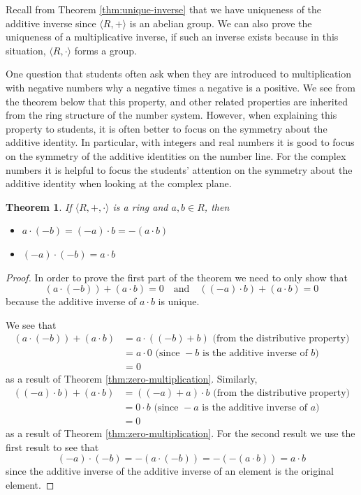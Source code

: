\documentclass[
]{book}
\newtheorem{theorem}{Theorem}[chapter]
\theoremstyle{definition}
\theoremstyle{definition}
\theoremstyle{definition}
\theoremstyle{definition}
\theoremstyle{remark}
\begin{document}
Recall from Theorem \ref{thm:unique-inverse} that we have uniqueness of the additive inverse since \(\langle R,+\rangle\) is an abelian group. We can also prove the uniqueness of a multiplicative inverse, if such an inverse exists because in this situation, \(\langle R,\cdot \rangle\) forms a group.

One question that students often ask when they are introduced to multiplication with negative numbers why a negative times a negative is a positive. We see from the theorem below that this property, and other related properties are inherited from the ring structure of the number system. However, when explaining this property to students, it is often better to focus on the symmetry about the additive identity. In particular, with integers and real numbers it is good to focus on the symmetry of the additive identities on the number line. For the complex numbers it is helpful to focus the students' attention on the symmetry about the additive identity when looking at the complex plane.

\begin{theorem}

If \(\langle R,+,\cdot\rangle\) is a ring and \(a,b \in R\), then

\begin{itemize}
\item
  \(a\cdot (-b)=(-a)\cdot b=-(a\cdot b)\)
\item
  \((-a)\cdot (-b)=a\cdot b\)
\end{itemize}

\end{theorem}

\begin{proof}
In order to prove the first part of the theorem we need to only show that
\[\left( a \cdot (-b) \right) + \left(a \cdot b\right) =0 \quad \mbox{and} \quad \left((-a)\cdot b\right)+\left(a \cdot b\right) =0\] because the additive inverse of \(a\cdot b\) is unique.

We see that
\begin{align*}
(a \cdot (-b)) + (a \cdot b ) &= a \cdot ((-b)+b) \mbox{ (from the distributive property)} \\
&= a \cdot 0 \mbox{ (since } -b \mbox{ is the additive inverse of }b)\\
&= 0
\end{align*}
as a result of Theorem \ref{thm:zero-multiplication}.
Similarly,
\begin{align*}
( (-a) \cdot b) + (a \cdot b) &= ((-a)+a)\cdot b \mbox{ (from the distributive property)} \\
&= 0 \cdot b \mbox{ (since } -a \mbox{ is the additive inverse of } a)\\
&= 0
\end{align*}
as a result of Theorem \ref{thm:zero-multiplication}.
For the second result we use the first result to see that
\[(-a)\cdot (-b) = -\left(a \cdot (-b)\right) = - \left( - \left(a\cdot b\right) \right) = a \cdot b\] since the additive inverse of the additive inverse of an element is the original element.
\end{proof}
\end{document}
